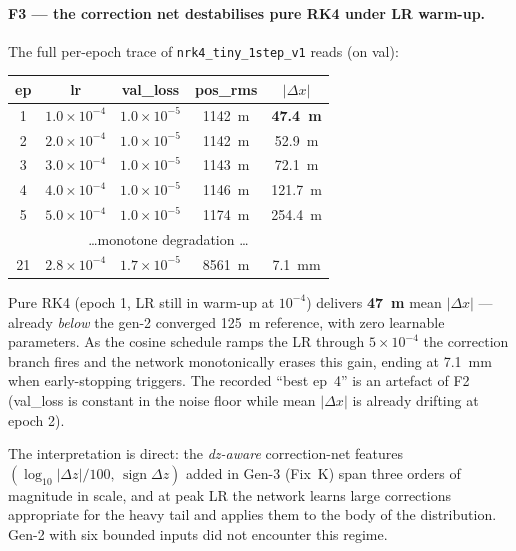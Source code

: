 \documentclass[a4paper,11pt]{article}
\newcommand{\SI}[2]{#1~#2}
\newcommand{\mm}{mm}
\newcommand{\dz}{\Delta z}
\begin{document}
\paragraph{F3 --- the correction net destabilises pure RK4 under
LR warm-up.}  The full per-epoch trace of
\texttt{nrk4\_tiny\_1step\_v1} reads (on val):

\begin{center}
\small
\begin{tabular}{ccccc}
\toprule
ep & lr & val\_loss & pos\_rms & $|\Delta x|$\\
\midrule
 1 & $1.0\!\times\!10^{-4}$ & $1.0\!\times\!10^{-5}$ & \SI{1142}{\mu m} & \textbf{\SI{47.4}{\mu m}}\\
 2 & $2.0\!\times\!10^{-4}$ & $1.0\!\times\!10^{-5}$ & \SI{1142}{\mu m} & \SI{52.9}{\mu m}\\
 3 & $3.0\!\times\!10^{-4}$ & $1.0\!\times\!10^{-5}$ & \SI{1143}{\mu m} & \SI{72.1}{\mu m}\\
 4 & $4.0\!\times\!10^{-4}$ & $1.0\!\times\!10^{-5}$ & \SI{1146}{\mu m} & \SI{121.7}{\mu m}\\
 5 & $5.0\!\times\!10^{-4}$ & $1.0\!\times\!10^{-5}$ & \SI{1174}{\mu m} & \SI{254.4}{\mu m}\\
 \multicolumn{5}{c}{\dots monotone degradation \dots}\\
21 & $2.8\!\times\!10^{-4}$ & $1.7\!\times\!10^{-5}$ & \SI{8561}{\mu m} & \SI{7.1}{\mm}\\
\bottomrule
\end{tabular}
\end{center}

\noindent Pure RK4 (epoch 1, LR still in warm-up at $10^{-4}$)
delivers \textbf{\SI{47}{\mu m}} mean $|\Delta x|$ --- already
\emph{below} the gen-2 converged \SI{125}{\mu m} reference, with
zero learnable parameters.  As the cosine schedule ramps the LR
through $5\!\times\!10^{-4}$ the correction branch fires and the
network monotonically erases this gain, ending at \SI{7.1}{\mm}
when early-stopping triggers.  The recorded ``best ep~4'' is an
artefact of F2 (val\_loss is constant in the noise floor while
mean $|\Delta x|$ is already drifting at epoch 2).

\noindent The interpretation is direct: the \emph{dz-aware}
correction-net features
$(\log_{10}|\dz|/100,\,\operatorname{sign}\dz)$ added in Gen-3
(Fix~K) span three orders of magnitude in scale, and at peak LR
the network learns large corrections appropriate for the heavy
tail and applies them to the body of the distribution.  Gen-2 with
six bounded inputs did not encounter this regime.
\end{document}
